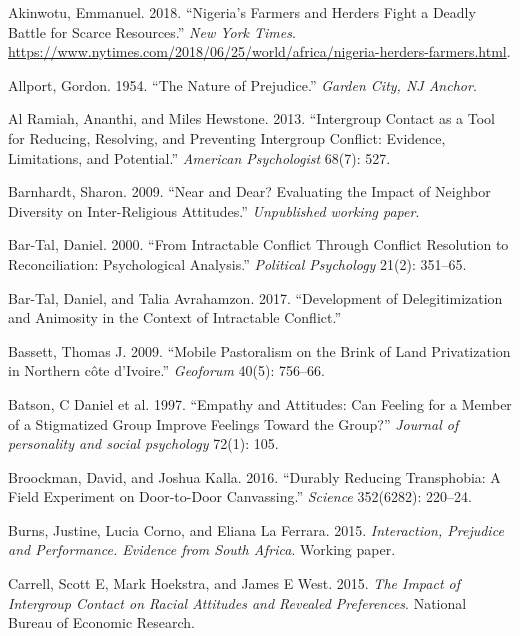 \documentclass[11pt]{article}
\begin{document}
\hypertarget{refs}{}
\leavevmode\hypertarget{ref-nyt2018nigeria}{}%
Akinwotu, Emmanuel. 2018. ``Nigeria's Farmers and Herders Fight a Deadly
Battle for Scarce Resources.'' \emph{New York Times}.
\url{https://www.nytimes.com/2018/06/25/world/africa/nigeria-herders-farmers.html}.

\leavevmode\hypertarget{ref-allport1954prejudice}{}%
Allport, Gordon. 1954. ``The Nature of Prejudice.'' \emph{Garden City,
NJ Anchor}.

\leavevmode\hypertarget{ref-al2013intergroup}{}%
Al Ramiah, Ananthi, and Miles Hewstone. 2013. ``Intergroup Contact as a
Tool for Reducing, Resolving, and Preventing Intergroup Conflict:
Evidence, Limitations, and Potential.'' \emph{American Psychologist}
68(7): 527.

\leavevmode\hypertarget{ref-barnhardt2009near}{}%
Barnhardt, Sharon. 2009. ``Near and Dear? Evaluating the Impact of
Neighbor Diversity on Inter-Religious Attitudes.'' \emph{Unpublished
working paper}.

\leavevmode\hypertarget{ref-bar2000intractable}{}%
Bar-Tal, Daniel. 2000. ``From Intractable Conflict Through Conflict
Resolution to Reconciliation: Psychological Analysis.'' \emph{Political
Psychology} 21(2): 351--65.

\leavevmode\hypertarget{ref-bar2017development}{}%
Bar-Tal, Daniel, and Talia Avrahamzon. 2017. ``Development of
Delegitimization and Animosity in the Context of Intractable Conflict.''

\leavevmode\hypertarget{ref-bassett2009mobile}{}%
Bassett, Thomas J. 2009. ``Mobile Pastoralism on the Brink of Land
Privatization in Northern côte d'Ivoire.'' \emph{Geoforum} 40(5):
756--66.

\leavevmode\hypertarget{ref-batson1997empathy}{}%
Batson, C Daniel et al. 1997. ``Empathy and Attitudes: Can Feeling for a
Member of a Stigmatized Group Improve Feelings Toward the Group?''
\emph{Journal of personality and social psychology} 72(1): 105.

\leavevmode\hypertarget{ref-broockman2016durably}{}%
Broockman, David, and Joshua Kalla. 2016. ``Durably Reducing
Transphobia: A Field Experiment on Door-to-Door Canvassing.''
\emph{Science} 352(6282): 220--24.

\leavevmode\hypertarget{ref-burns2015interaction}{}%
Burns, Justine, Lucia Corno, and Eliana La Ferrara. 2015.
\emph{Interaction, Prejudice and Performance. Evidence from South
Africa}. Working paper.

\leavevmode\hypertarget{ref-carrell2015impact}{}%
Carrell, Scott E, Mark Hoekstra, and James E West. 2015. \emph{The
Impact of Intergroup Contact on Racial Attitudes and Revealed
Preferences}. National Bureau of Economic Research.
\end{document}
